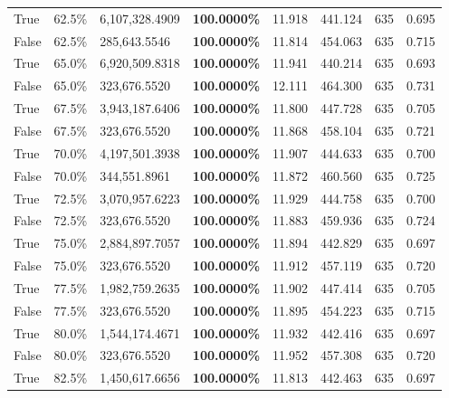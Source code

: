 \begin{table}[H]
\begin{tabular}{lllrllll}
\cline{1-8}
True & 62.5\% & 6,107,328.4909 & \bfseries \color{red} 100.0000\% & 11.918 & 441.124 & 635 & 0.695 \\
\cline{1-8}
False & 62.5\% & \color{red} 285,643.5546 & \bfseries \color{red} 100.0000\% & 11.814 & 454.063 & 635 & 0.715 \\
\cline{1-8}
True & 65.0\% & 6,920,509.8318 & \bfseries \color{red} 100.0000\% & 11.941 & 440.214 & 635 & 0.693 \\
\cline{1-8}
False & 65.0\% & 323,676.5520 & \bfseries \color{red} 100.0000\% & 12.111 & 464.300 & 635 & 0.731 \\
\cline{1-8}
True & 67.5\% & 3,943,187.6406 & \bfseries \color{red} 100.0000\% & 11.800 & 447.728 & 635 & 0.705 \\
\cline{1-8}
False & 67.5\% & 323,676.5520 & \bfseries \color{red} 100.0000\% & 11.868 & 458.104 & 635 & 0.721 \\
\cline{1-8}
True & 70.0\% & 4,197,501.3938 & \bfseries \color{red} 100.0000\% & 11.907 & 444.633 & 635 & 0.700 \\
\cline{1-8}
False & 70.0\% & 344,551.8961 & \bfseries \color{red} 100.0000\% & 11.872 & 460.560 & 635 & 0.725 \\
\cline{1-8}
True & 72.5\% & 3,070,957.6223 & \bfseries \color{red} 100.0000\% & 11.929 & 444.758 & 635 & 0.700 \\
\cline{1-8}
False & 72.5\% & 323,676.5520 & \bfseries \color{red} 100.0000\% & 11.883 & 459.936 & 635 & 0.724 \\
\cline{1-8}
True & 75.0\% & 2,884,897.7057 & \bfseries \color{red} 100.0000\% & 11.894 & 442.829 & 635 & 0.697 \\
\cline{1-8}
False & 75.0\% & 323,676.5520 & \bfseries \color{red} 100.0000\% & 11.912 & 457.119 & 635 & 0.720 \\
\cline{1-8}
True & 77.5\% & 1,982,759.2635 & \bfseries \color{red} 100.0000\% & 11.902 & 447.414 & 635 & 0.705 \\
\cline{1-8}
False & 77.5\% & 323,676.5520 & \bfseries \color{red} 100.0000\% & 11.895 & 454.223 & 635 & 0.715 \\
\cline{1-8}
True & 80.0\% & 1,544,174.4671 & \bfseries \color{red} 100.0000\% & 11.932 & 442.416 & 635 & 0.697 \\
\cline{1-8}
False & 80.0\% & 323,676.5520 & \bfseries \color{red} 100.0000\% & 11.952 & 457.308 & 635 & 0.720 \\
\cline{1-8}
True & 82.5\% & 1,450,617.6656 & \bfseries \color{red} 100.0000\% & 11.813 & 442.463 & 635 & 0.697 \\

\end{tabular}
\end{table}
